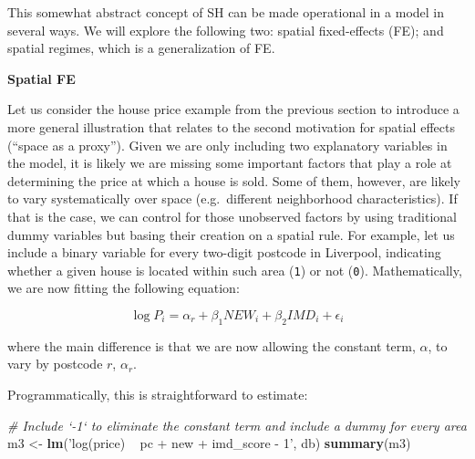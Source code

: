\documentclass[
]{book}
\newenvironment{Shaded}{\begin{snugshade}}{\end{snugshade}}
\newcommand{\CommentTok}[1]{\textcolor[rgb]{0.56,0.35,0.01}{\textit{#1}}}
\newcommand{\KeywordTok}[1]{\textcolor[rgb]{0.13,0.29,0.53}{\textbf{#1}}}
\newcommand{\NormalTok}[1]{#1}
\newcommand{\StringTok}[1]{\textcolor[rgb]{0.31,0.60,0.02}{#1}}
\begin{document}
This somewhat abstract concept of SH can be made operational in a model in several ways. We will explore the following two: spatial fixed-effects (FE); and spatial regimes, which is a generalization of FE.

\textbf{Spatial FE}

Let us consider the house price example from the previous section to introduce a more general illustration that relates to the second motivation for spatial effects (``space as a proxy''). Given we are only including two explanatory variables in the model, it is likely we are missing some important factors that play a role at determining the price at which a house is sold. Some of them, however, are likely to vary systematically over space (e.g.~different neighborhood characteristics). If that is the case, we can control for those unobserved factors by using traditional dummy variables but basing their creation on a spatial rule. For example, let us include a binary variable for every two-digit postcode in Liverpool, indicating whether a given house is located within such area (\texttt{1}) or not (\texttt{0}). Mathematically, we are now fitting the following equation:

\[
\log{P_i} = \alpha_r + \beta_1 NEW_i + \beta_2 IMD_i + \epsilon_i
\]

where the main difference is that we are now allowing the constant term, \(\alpha\), to vary by postcode \(r\), \(\alpha_r\).

Programmatically, this is straightforward to estimate:

\begin{Shaded}
\begin{Highlighting}[]
\CommentTok{# Include `-1` to eliminate the constant term and include a dummy for every area}
\NormalTok{m3 <-}\StringTok{ }\KeywordTok{lm}\NormalTok{(}\StringTok{'log(price) ~ pc + new + imd_score - 1'}\NormalTok{, db)}
\KeywordTok{summary}\NormalTok{(m3)}
\end{Highlighting}
\end{Shaded}
\end{document}
